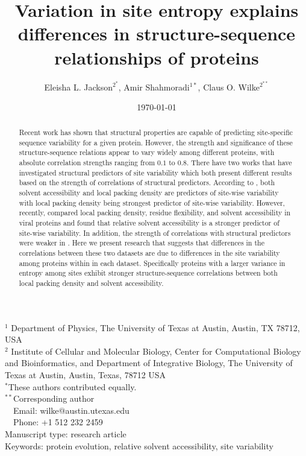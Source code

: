 \documentclass[12pt]{article}
\title{Variation in site entropy explains differences in structure-sequence relationships of proteins}
\author{Eleisha L. Jackson$^{2^*}$, Amir Shahmoradi$^{1*}$, Claus O. Wilke$^{2^{**}}$}
\begin{document}
\date{\today}
\maketitle


\noindent
$^1$ Department of Physics, The University of Texas at Austin, Austin, TX 78712, USA \\
$^2$ Institute of Cellular and Molecular Biology, Center for Computational Biology and Bioinformatics, and Department of Integrative Biology, The University of Texas at Austin, Austin, Texas, 78712 USA\\

\noindent $^{*}$These authors contributed equally. \\

\bigskip
\noindent
$^{**}$Corresponding author\\
$\phantom{^{** }}$Email: wilke@austin.utexas.edu\\
$\phantom{^{**}}$Phone: +1 512 232 2459\\

\bigskip
\noindent
Manuscript type: research article\\
\bigskip
\noindent  Keywords: protein evolution, relative solvent accessibility, site variability


\begin{abstract}
Recent work has shown that structural properties are capable of predicting site-specific sequence variability for a given protein. However, the strength and significance of these structure-sequence relations appear to vary widely among different proteins, with absolute correlation strengths ranging from $0.1$ to $0.8$. There have two works that have investigated structural predictors of site variability which both present different results based on the strength of correlations of structural predictors. According to \cite{Yehetal2014}, both solvent accessibility and  local packing density are predictors of site-wise variability with local packing density being strongest predictor of site-wise variability. However, recently, \cite{Shahmoradietal2014} compared local packing density, residue flexibility, and solvent accessibility in viral proteins and found that relative solvent accessibility is a stronger predictor of site-wise variability. In addition, the strength of correlations with structural predictors were weaker in \cite{Shahmoradietal2014}.  Here we present research that suggests that differences in the correlations between these two datasets are due to differences in the site variability among proteins within in each dataset. Specifically proteins with a larger variance in entropy among sites exhibit stronger structure-sequence correlations between both local packing density and solvent accessibility. 
\end{abstract}
\vfill
\vfill
\def\thefootnote{\fnsymbol{footnote}}
\setcounter{footnote}{0}
\end{document}
